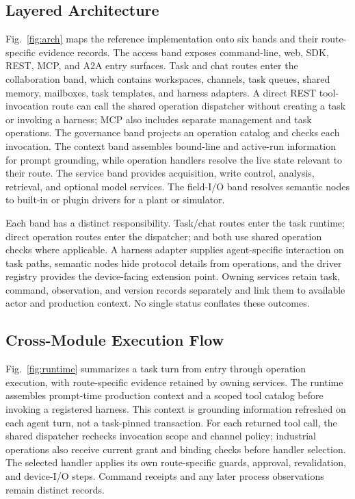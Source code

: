 \subsection{Layered Architecture}
\label{sec:layers}
\label{sec:arch}
Fig.~\ref{fig:arch} maps the reference implementation onto six bands and
their route-specific evidence records. The access band exposes command-line,
web, SDK, REST, MCP, and A2A entry surfaces. Task and chat routes enter the
collaboration band, which contains workspaces, channels, task queues, shared
memory, mailboxes, task templates, and harness adapters. A direct REST
tool-invocation route can call the shared operation dispatcher without
creating a task or invoking a harness; MCP also includes separate management
and task operations. The governance band projects an operation catalog and
checks each invocation. The context band assembles bound-line and active-run
information for prompt grounding, while operation handlers resolve the live
state relevant to their route. The service band provides acquisition, write
control, analysis, retrieval, and optional model services. The field-I/O band
resolves semantic nodes to built-in or plugin drivers for a plant or
simulator.

Each band has a distinct responsibility. Task/chat routes enter the task
runtime; direct operation routes enter the dispatcher; and both use shared
operation checks where applicable. A harness adapter supplies
agent-specific interaction on task paths, semantic nodes hide protocol
details from operations, and the driver registry provides the device-facing
extension point. Owning services retain task, command, observation, and
version records separately and link them to available actor and production
context. No single status conflates these outcomes.

\subsection{Cross-Module Execution Flow}
\label{sec:executionflow}
Fig.~\ref{fig:runtime} summarizes a task turn from entry through operation
execution, with route-specific evidence retained by owning services. The
runtime assembles prompt-time production context and a scoped tool catalog
before invoking a registered harness. This context is grounding information
refreshed on each agent turn, not a task-pinned transaction. For
each returned tool call, the shared dispatcher rechecks invocation scope
and channel policy; industrial operations also receive current grant and
binding checks before handler selection. The selected handler applies its
own route-specific guards, approval, revalidation, and device-I/O steps.
Command receipts and any later process observations remain distinct records.

